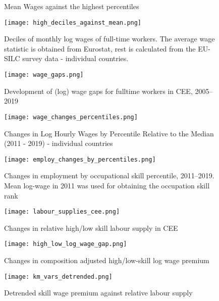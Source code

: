 \documentclass{article}
\begin{document}
\begin{figure}[!htbp]%
    \centering
    \caption{Mean Wages against the highest percentiles}
    {\texttt{[image: high\_deciles\_against\_mean.png]} }
    \label{high_deciles_vs_meam_w_cee}
    \caption*{Deciles of monthly log wages of full-time workers. The average wage statistic is obtained from Eurostat, rest is calculated from the EU-SILC survey data - individual countries.}
\end{figure}




\begin{figure}[!htbp]%
    \centering
    \caption{Development of (log) wage gaps for fulltime workers in CEE, 2005–2019}
    {\texttt{[image: wage\_gaps.png]} }
    \label{wage_gaps_CEE}
\end{figure}

\begin{figure}[!htbp]%
    \centering
    \caption{Changes in Log Hourly Wages by Percentile Relative to the Median (2011 - 2019) - individual countries}
    {\texttt{[image: wage\_changes\_percentiles.png]} }
    \label{wage_changes_percentiles}
\end{figure}

\begin{figure}[!htbp]%
    \centering
    \caption{Changes in employment by occupational skill percentile, 2011–2019. Mean log-wage in 2011 was used for obtaining the occupation skill rank}
    {\texttt{[image: employ\_changes\_by\_percentiles.png]} }
    \label{employ_changes_percentiles}
\end{figure}

\begin{figure}[!htbp]%
        \centering
        \caption{Changes in relative high/low skill labour supply in CEE}
        {\texttt{[image: labour\_supplies\_cee.png]}}
        \label{labour_supplies_cee}
\end{figure}

\begin{figure}[!htbp]%
    \centering
    \caption{Changes in composition adjusted high/low-skill log wage premium}
    {\texttt{[image: high\_low\_log\_wage\_gap.png]}}
    \label{high_low_log_wage_gap}
\end{figure}


\begin{figure}[!htbp]%
    \centering
    {\texttt{[image: km\_vars\_detrended.png]} }
    \caption{Detrended skill wage premium against relative labour supply}
    \label{km_vars_detrended}
\end{figure}
\end{document}
